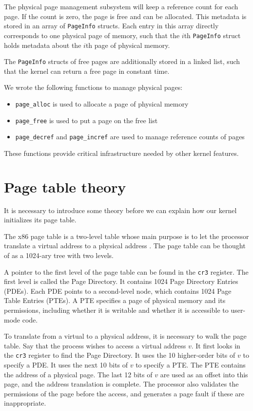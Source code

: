 \documentclass{report}
\begin{document}
The physical page management subsystem will keep a reference count for each
page. If the count is zero, the page is free and can be allocated. This
metadata is stored in an array of \texttt{PageInfo} structs. Each entry in
this array directly corresponds to one physical page of memory, such that the
$i$th \texttt{PageInfo} struct holds metadata about the $i$th page of physical
memory.

The \texttt{PageInfo} structs of free pages are additionally stored in a
linked list, such that the kernel can return a free page in constant time.

We wrote the following functions to manage physical pages:
\begin{itemize}
\item \texttt{page\_alloc} is used to allocate a page of physical memory
\item \texttt{page\_free} is used to put a page on the free list
\item \texttt{page\_decref} and \texttt{page\_incref} are used to manage
reference counts of pages
\end{itemize}
These functions provide critical infrastructure needed by other kernel
features.



\section{Page table theory}
It is necessary to introduce some theory before we can explain how our kernel
initializes its page table.

The x86 page table is a two-level table whose main purpose is to let the
processor translate a virtual address to a physical address
\cite{manual8086ch5}. The page table can be thought of as a 1024-ary tree with
two levels. 

A pointer to the first level of the page table can be found in the
\texttt{cr3} register. The first level is called the Page Directory. It
contains 1024 Page Directory Entries (PDEs). Each PDE points to a
second-level node, which contains 1024 Page Table Entries (PTEs). 
A PTE specifies a page of physical memory and its permissions, including
whether it is writable and whether it is accessible to user-mode code.

To translate from a virtual to a physical address, it is necessary to walk the
page table. Say that the process wishes to access a virtual address $v$. It
first looks in the \texttt{cr3} register to find the Page Directory. It uses the
10 higher-order bits of $v$ to specify a PDE. It uses the next 10 bits
of $v$ to specify a PTE. The PTE contains the address of a
physical page. The last 12 bits of $v$ are used as an offset into this page,
and the address translation is complete. The processor also validates the
permissions of the page before the access, and generates a page fault if these
are inappropriate.
\end{document}
